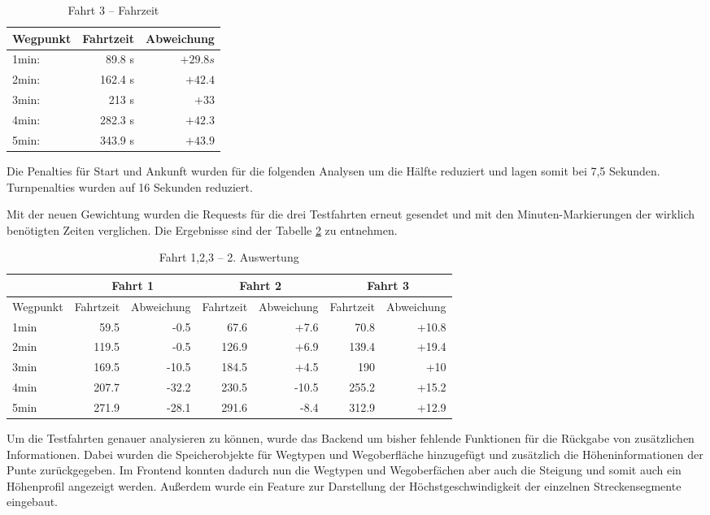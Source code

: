 \begin{table}[]
\centering
\caption{Fahrt 3 -- Fahrzeit}
\label{tab:drive3}
\begin{tabular}{|l|r|r|}
\hline
Wegpunkt & Fahrtzeit & Abweichung \\ \hline 
1min: &  89.8 s & $+29.8s$ \\
2min: &  162.4 s & $+42.4$ \\
3min: &  213 s & $+33$ \\
4min: &  282.3 s & $+42.3$ \\
5min: &  343.9 s & $+43.9$ \\
\hline
\end{tabular}
\end{table}

Die Penalties für Start und Ankunft wurden für die folgenden Analysen um die Hälfte reduziert und lagen somit bei 7,5 Sekunden.
Turnpenalties wurden auf 16 Sekunden reduziert.

Mit der neuen Gewichtung wurden die Requests für die drei Testfahrten erneut gesendet und mit den Minuten-Markierungen der wirklich benötigten Zeiten verglichen.
Die Ergebnisse sind der Tabelle \ref{tab:all} zu entnehmen.

\begin{table}[]
\centering
\caption{Fahrt 1,2,3 -- 2. Auswertung}
\label{tab:all}
\begin{tabular}{|l|r|r|r|r|r|r|}
\hhline{~|-|-|-|-|-|-}
\multicolumn{1}{l|}{} & \multicolumn{2}{c|}{Fahrt 1} & \multicolumn{2}{c|}{Fahrt 2} & \multicolumn{2}{c|}{Fahrt 3} \\ \hline
Wegpunkt & Fahrtzeit & Abweichung & Fahrtzeit & Abweichung & Fahrtzeit & Abweichung \\ \hline 
1min & 59.5 & -0.5 & 67.6 & +7.6 & 70.8 & +10.8  \\
2min & 119.5 & -0.5 & 126.9 & +6.9 & 139.4 & +19.4  \\
3min & 169.5 & -10.5 & 184.5 & +4.5 & 190 & +10  \\
4min & 207.7 & -32.2 & 230.5 & -10.5 & 255.2 & +15.2  \\
5min & 271.9 & -28.1 & 291.6 & -8.4 & 312.9 & +12.9   \\
\hline
\end{tabular}
\end{table}


Um die Testfahrten genauer analysieren zu können, wurde das Backend um bisher fehlende Funktionen für die Rückgabe von zusätzlichen Informationen.
Dabei wurden die Speicherobjekte für Wegtypen und Wegoberfläche hinzugefügt und zusätzlich die Höheninformationen der Punte zurückgegeben.
Im Frontend konnten dadurch nun die Wegtypen und Wegoberfächen aber auch die Steigung und somit auch ein Höhenprofil angezeigt werden.
Außerdem wurde ein Feature zur Darstellung der Höchstgeschwindigkeit der einzelnen Streckensegmente eingebaut.